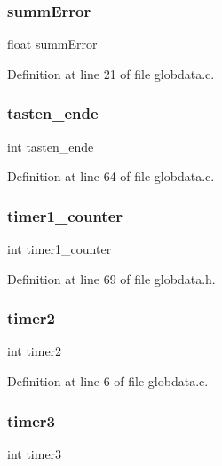 \subsubsection{summ\+Error}
{\footnotesize\ttfamily float summ\+Error}



Definition at line 21 of file globdata.\+c.

\mbox{\label{globdata_8h_aff6c80ed26dca833cec34c381bbce97d}} 
\subsubsection{tasten\+\_\+ende}
{\footnotesize\ttfamily int tasten\+\_\+ende}



Definition at line 64 of file globdata.\+c.

\mbox{\label{globdata_8h_a83000442396f36de5caccf11856a3548}} 
\subsubsection{timer1\+\_\+counter}
{\footnotesize\ttfamily int timer1\+\_\+counter}



Definition at line 69 of file globdata.\+h.

\mbox{\label{globdata_8h_a8d81fe249a7ca1b7b1c7c9378da8f006}} 
\subsubsection{timer2}
{\footnotesize\ttfamily int timer2}



Definition at line 6 of file globdata.\+c.

\mbox{\label{globdata_8h_a0976503fef01ed7144670e9ffde047b4}} 
\subsubsection{timer3}
{\footnotesize\ttfamily int timer3}



